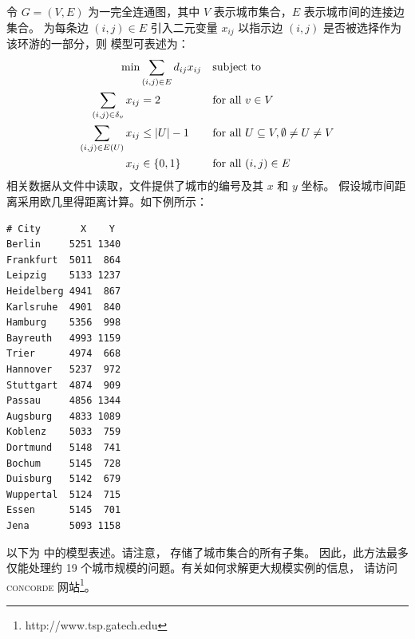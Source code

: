 令 $G=(V,E)$ 为一完全连通图，其中 $V$ 表示城市集合，$E$ 表示城市间的连接边集合。
为每条边 $(i,j)\in E$ 引入二元变量 $x_{ij}$ 以指示边 $(i,j)$ 
是否被选择作为该环游的一部分，则 \tsp 模型可表述为：
\begin{align*}
\min &\sum_{(i,j)\in E}d_{ij} x_{ij}&&\text{subject to}\nonumber\\
\sum_{(i,j)\in\delta_v} x_{ij}&=2&&\text{for all } v\in V\nonumber\\
\sum_{(i,j)\in E(U)} x_{ij}&\leq |U|-1&&\text{for all } U\subseteq V, \emptyset\neq
U\neq V\\
x_{ij}&\in\{0,1\}&&\text{for all } (i,j)\in E\nonumber
\end{align*}
%
相关数据从文件中读取，文件提供了城市的编号及其 $x$ 和 $y$ 坐标。
假设城市间距离采用欧几里得距离计算。如下例所示：
{\footnotesize
\setlength\columnseprule{0.4pt}
\begin{multicols}{2}
\begin{verbatim}
# City       X    Y
Berlin     5251 1340
Frankfurt  5011  864
Leipzig    5133 1237
Heidelberg 4941  867
Karlsruhe  4901  840
Hamburg    5356  998
Bayreuth   4993 1159
Trier      4974  668
Hannover   5237  972
Stuttgart  4874  909
Passau     4856 1344
Augsburg   4833 1089
Koblenz    5033  759
Dortmund   5148  741
Bochum     5145  728
Duisburg   5142  679
Wuppertal  5124  715
Essen      5145  701
Jena       5093 1158
\end{verbatim}
\end{multicols}
}



\noindent 以下为 \zimpl 中的模型表述。请注意， 存储了城市集合的所有子集。
因此，此方法最多仅能处理约 19 个城市规模的问题。有关如何求解更大规模实例的信息，
请访问 \textsc{concorde} 网站\footnote{http://www.tsp.gatech.edu}。

